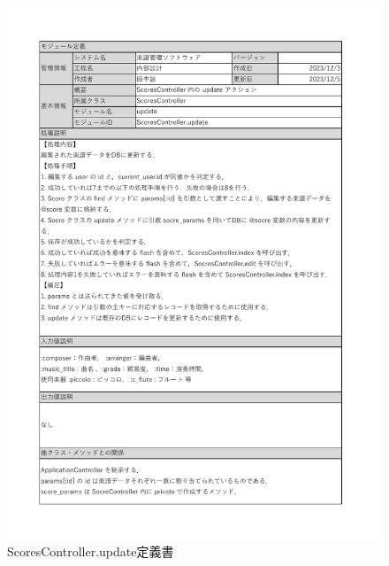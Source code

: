 \begin{figure}[h]
    \centering
    \includegraphics[scale=0.7]{img/Scores/xlsx/ScoresController_update.pdf}
    \vspace{-1cm}
    \caption{ScoresController.update定義書}
\end{figure}
